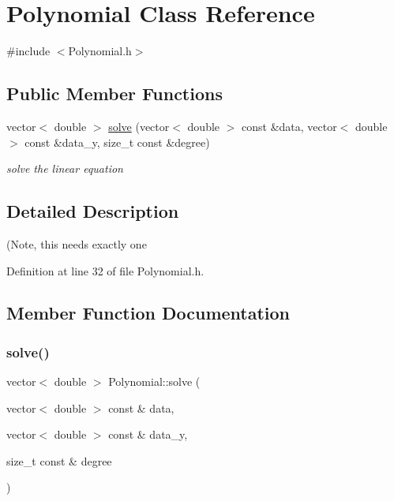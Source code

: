 \hypertarget{class_polynomial}{}\section{Polynomial Class Reference}
\label{class_polynomial}


{\ttfamily \#include $<$Polynomial.\+h$>$}

\subsection*{Public Member Functions}
\begin{DoxyCompactItemize}
\item 
vector$<$ double $>$ \mbox{\hyperlink{class_polynomial_ae67730df0a2e45a87c9cb244fe03ad6b}{solve}} (vector$<$ double $>$ const \&data, vector$<$ double $>$ const \&data\+\_\+y, size\+\_\+t const \&degree)
\begin{DoxyCompactList}\small\item\em solve the linear equation \end{DoxyCompactList}\end{DoxyCompactItemize}


\subsection{Detailed Description}
(Note, this needs exactly one 

Definition at line 32 of file Polynomial.\+h.



\subsection{Member Function Documentation}
\mbox{\label{class_polynomial_ae67730df0a2e45a87c9cb244fe03ad6b}} 
\subsubsection{\texorpdfstring{solve()}{solve()}}
{\footnotesize\ttfamily vector$<$ double $>$ Polynomial\+::solve (\begin{DoxyParamCaption}\item[{vector$<$ double $>$ const \&}]{data,  }\item[{vector$<$ double $>$ const \&}]{data\+\_\+y,  }\item[{size\+\_\+t const \&}]{degree }\end{DoxyParamCaption})}



